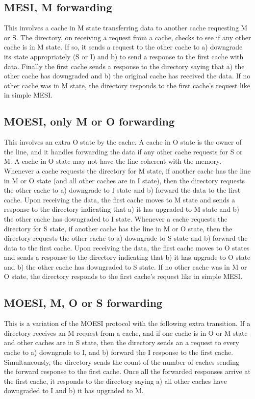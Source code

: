 \subsection{MESI, M forwarding}
This involves a cache in M state transferring data to another cache requesting M
or S. The directory, on receiving a request from a cache, checks to see if any
other cache is in M state. If so, it sends a request to the other cache to a)
downgrade its state appropriately (S or I) and b) to send a response to the
first cache with data. Finally the first cache sends a response to the directory
saying that a) the other cache has downgraded and b) the original cache has
received the data. If no other cache was in M state, the directory responds to
the first cache's request like in simple MESI.

\subsection{MOESI, only M or O forwarding}
This involves an extra O state by the cache. A cache in O state is the owner of
the line, and it handles forwarding the data if any other cache requests for S
or M. A cache in O state may not have the line coherent with the memory.
Whenever a cache requests the directory for M state, if another cache has the
line in M or O state (and all other caches are in I state), then the directory
requests the other cache to a) downgrade to I state and b) forward the data to
the first cache. Upon receiving the data, the first cache moves to M state and
sends a response to the directory indicating that a) it has upgraded to M state
and b) the other cache has downgraded to I state.  Whenever a cache requests the
directory for S state, if another cache has the line in M or O state, then the
directory requests the other cache to a) downgrade to S state and b) forward the
data to the first cache. Upon receiving the data, the first cache moves to O
states and sends a response to the directory indicating that b) it has upgrade
to O state and b) the other cache has downgraded to S state. If no other cache
was in M or O state, the directory responds to the first cache's request like in
simple MESI.

\subsection{MOESI, M, O or S forwarding}
This is a variation of the MOESI protocol with the following extra transition.
If a directory receives an M request from a cache, and if one cache is in O or M
state and other caches are in S state, then the directory sends an a request to
every cache to a) downgrade to I, and b) forward the I response to the first
cache.  Simultaneously, the directory sends the count of the number of caches
sending the forward response to the first cache. Once all the forwarded
responses arrive at the first cache, it responds to the directory saying a) all
other caches have downgraded to I and b) it has upgraded to M.
